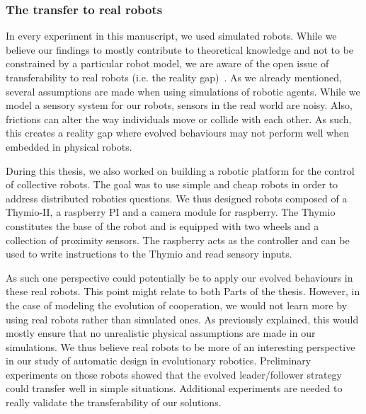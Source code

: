 		\subsubsection{The transfer to real robots}

			In every experiment in this manuscript, we used simulated robots. While we believe our findings to mostly contribute to theoretical knowledge and not to be constrained by a particular robot model, we are aware of the open issue of transferability to real robots (i.e. the reality gap)~\parencite{Jakobi1995, Mouret2012b, Doncieux2015a}. As we already mentioned, several assumptions are made when using simulations of robotic agents. While we model a sensory system for our robots, sensors in the real world are noisy. Also, frictions can alter the way individuals move or collide with each other. As such, this creates a reality gap where evolved behaviours may not perform well when embedded in physical robots.

			During this thesis, we also worked on building a robotic platform for the control of collective robots. The goal was to use simple and cheap robots in order to address distributed robotics questions. We thus designed robots composed of a Thymio-II, a raspberry PI and a camera module for raspberry. The Thymio constitutes the base of the robot and is equipped with two wheels and a collection of proximity sensors. The raspberry acts as the controller and can be used to write instructions to the Thymio and read sensory inputs.


			As such one perspective could potentially be to apply our evolved behaviours in these real robots. This point might relate to both Parts of the thesis. However, in the case of modeling the evolution of cooperation, we would not learn more by using real robots rather than simulated ones. As previously explained, this would mostly ensure that no unrealistic physical assumptions are made in our simulations. We thus believe real robots to be more of an interesting perspective in our study of automatic design in evolutionary robotics. Preliminary experiments on those robots showed that the evolved leader/follower strategy could transfer well in simple situations. Additional experiments are needed to really validate the transferability of our solutions.


